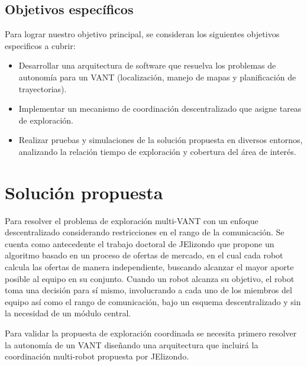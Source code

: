 \subsection*{Objetivos específicos}

Para lograr nuestro objetivo principal, se consideran los siguientes objetivos especificos a cubrir:

\begin{itemize}\setlength{\itemsep}{-1mm}
\item Desarrollar una arquitectura de software que resuelva los problemas de autonomía para un VANT (localización, manejo de mapas y planificación de trayectorias).
\item Implementar un mecanismo de coordinación descentralizado que asigne tareas de exploración.
\item Realizar pruebas y simulaciones de la solución propuesta en diversos entornos, analizando la relación tiempo de exploración y cobertura del área de interés.
\end{itemize}

\section{Solución propuesta}

Para resolver el problema de exploración multi-VANT con un enfoque descentralizado considerando restricciones en el rango de la comunicación. Se cuenta como antecedente el trabajo doctoral de JElizondo que propone un algoritmo basado en un proceso de ofertas de mercado, en el cual cada robot calcula las ofertas de manera independiente, buscando alcanzar el mayor aporte posible al equipo en su conjunto. Cuando un robot alcanza su objetivo, el robot toma una decisión para sí mismo, involucrando a cada uno de los miembros del equipo así como el rango de comunicación, bajo un esquema descentralizado y sin la necesidad de un módulo central.

Para validar la propuesta de exploración coordinada se necesita primero resolver la autonomía de un VANT diseñando una arquitectura que incluirá la coordinación multi-robot propuesta por JElizondo.  

